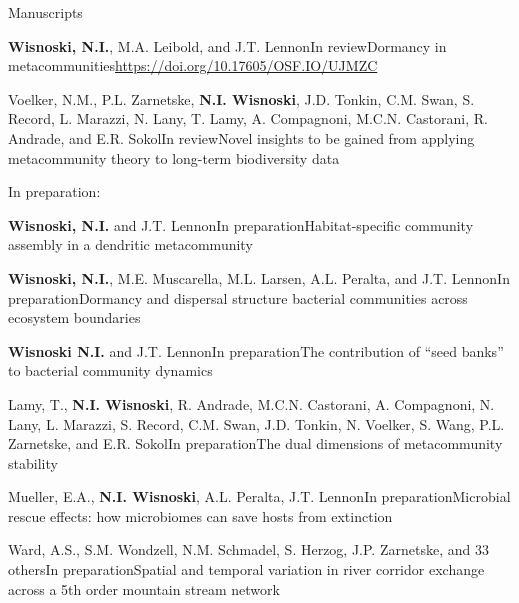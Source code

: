 \documentclass{resume} %
\begin{document}
\bigskip
\newpage

\begin{rhangSection}{Manuscripts}

\begin{Prep}{{\bf Wisnoski, N.I.}, M.A. Leibold, and J.T. Lennon}{In review}{Dormancy in metacommunities}{\url{https://doi.org/10.17605/OSF.IO/UJMZC}}
\end{Prep}

\begin{Prep}{Voelker, N.M., P.L. Zarnetske, {\bf N.I. Wisnoski}, J.D. Tonkin, C.M. Swan, S. Record, L. Marazzi, N. Lany, T. Lamy, A. Compagnoni, M.C.N. Castorani, R. Andrade, and E.R. Sokol}{In review}{Novel insights to be gained from applying metacommunity theory to long-term biodiversity data}{}
\end{Prep}

\smallskip
{ In preparation:}

\begin{Prep}{{\bf Wisnoski, N.I.} and J.T. Lennon}{In preparation}{Habitat-specific community assembly in a dendritic metacommunity}{}
\end{Prep}

\begin{Prep}{{\bf Wisnoski, N.I.}, M.E. Muscarella, M.L. Larsen, A.L. Peralta, and J.T. Lennon}{In preparation}{Dormancy and dispersal structure bacterial communities across ecosystem boundaries}{}
\end{Prep}

\begin{Prep}{{\bf Wisnoski N.I.} and J.T. Lennon}{In preparation}{The contribution of \enquote{seed banks} to bacterial community dynamics}{}
\end{Prep}

\begin{Prep}{Lamy, T., {\bf N.I. Wisnoski}, R. Andrade, M.C.N. Castorani, A. Compagnoni, N. Lany, L. Marazzi, S. Record, C.M. Swan, J.D. Tonkin, N. Voelker, S. Wang, P.L. Zarnetske, and E.R. Sokol}{In preparation}{The dual dimensions of metacommunity stability}{}
\end{Prep}

\begin{Prep}{Mueller, E.A., {\bf N.I. Wisnoski}, A.L. Peralta, J.T. Lennon}{In preparation}{Microbial rescue effects: how microbiomes can save hosts from extinction}{}
\end{Prep}

\begin{Prep}{Ward, A.S., S.M. Wondzell, N.M. Schmadel, S. Herzog, J.P. Zarnetske, and 33 others}{In preparation}{Spatial and temporal variation in river corridor exchange across a 5th order mountain stream network}{}
\end{Prep}

\end{rhangSection}
\end{document}
